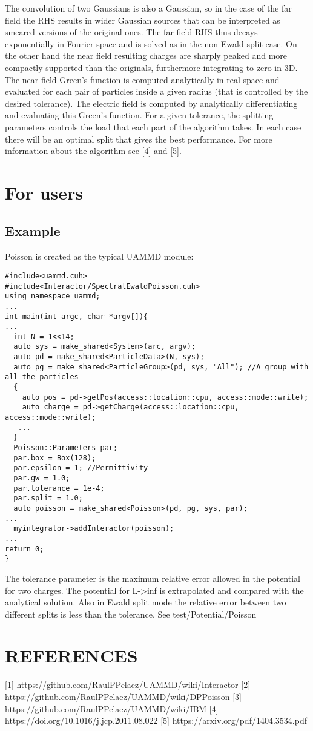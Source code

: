 The convolution of two Gaussians is also a Gaussian, so in the case of the far field the RHS results in wider Gaussian sources that can be interpreted as smeared versions of the original ones. The far field RHS thus decays exponentially in Fourier space and is solved as in the non Ewald split case.  
On the other hand the near field resulting charges are sharply peaked and more compactly supported than the originals, furthermore integrating to zero in 3D.  
The near field Green's function is computed analytically in real space and evaluated for each pair of particles inside a given radius (that is controlled by the desired tolerance). The electric field is computed by analytically differentiating and evaluating this Green's function.  
For a given tolerance, the splitting parameters controls the load that each part of the algorithm takes. In each case there will be an optimal split that gives the best performance.  
For more information about the algorithm see [4] and [5].  

\section{For users}

\subsection{Example}
Poisson is created as the typical UAMMD module:

\begin{verbatim}
#include<uammd.cuh>
#include<Interactor/SpectralEwaldPoisson.cuh>
using namespace uammd;
...
int main(int argc, char *argv[]){
...
  int N = 1<<14;
  auto sys = make_shared<System>(arc, argv);
  auto pd = make_shared<ParticleData>(N, sys);          
  auto pg = make_shared<ParticleGroup>(pd, sys, "All"); //A group with all the particles
  {
    auto pos = pd->getPos(access::location::cpu, access::mode::write);
    auto charge = pd->getCharge(access::location::cpu, access::mode::write);
   ...
  }
  Poisson::Parameters par;
  par.box = Box(128);
  par.epsilon = 1; //Permittivity
  par.gw = 1.0;
  par.tolerance = 1e-4;
  par.split = 1.0;
  auto poisson = make_shared<Poisson>(pd, pg, sys, par);
...
  myintegrator->addInteractor(poisson);
...
return 0;
}
\end{verbatim}
The tolerance parameter is the maximum relative error allowed in the potential for two charges. The potential for L->inf is extrapolated and compared with the analytical solution. Also in Ewald split mode the relative error between two different splits is less than the tolerance. See test/Potential/Poisson  
\section{REFERENCES}
[1] https://github.com/RaulPPelaez/UAMMD/wiki/Interactor   
[2] https://github.com/RaulPPelaez/UAMMD/wiki/DPPoisson  
[3] https://github.com/RaulPPelaez/UAMMD/wiki/IBM  
[4] https://doi.org/10.1016/j.jcp.2011.08.022  
[5] https://arxiv.org/pdf/1404.3534.pdf  